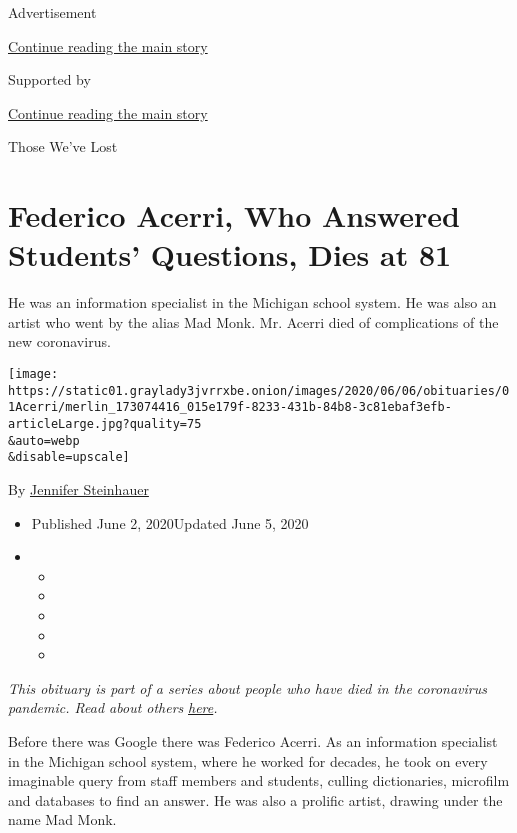 Advertisement

\protect\hyperlink{after-top}{Continue reading the main story}

Supported by

\protect\hyperlink{after-sponsor}{Continue reading the main story}

Those We've Lost

\hypertarget{federico-acerri-who-answered-students-questions-dies-at-81}{%
\section{Federico Acerri, Who Answered Students' Questions, Dies at
81}\label{federico-acerri-who-answered-students-questions-dies-at-81}}

He was an information specialist in the Michigan school system. He was
also an artist who went by the alias Mad Monk. Mr. Acerri died of
complications of the new coronavirus.

\texttt{[image: https://static01.graylady3jvrrxbe.onion/images/2020/06/06/obituaries/01Acerri/merlin\_173074416\_015e179f-8233-431b-84b8-3c81ebaf3efb-articleLarge.jpg?quality=75\\\&auto=webp\\\&disable=upscale]}

By
\href{https://www.nytimes3xbfgragh.onion/by/jennifer-steinhauer}{Jennifer
Steinhauer}

\begin{itemize}
\item
  Published June 2, 2020Updated June 5, 2020
\item
  \begin{itemize}
  \item
  \item
  \item
  \item
  \item
  \end{itemize}
\end{itemize}

\emph{This obituary is part of a series about people who have died in
the coronavirus pandemic. Read about others}
\href{https://www.nytimes3xbfgragh.onion/interactive/2020/obituaries/people-died-coronavirus-obituaries.html}{\emph{here}}\emph{.}

Before there was Google there was Federico Acerri. As an information
specialist in the Michigan school system, where he worked for decades,
he took on every imaginable query from staff members and students,
culling dictionaries, microfilm and databases to find an answer. He was
also a prolific artist, drawing under the name Mad Monk.


